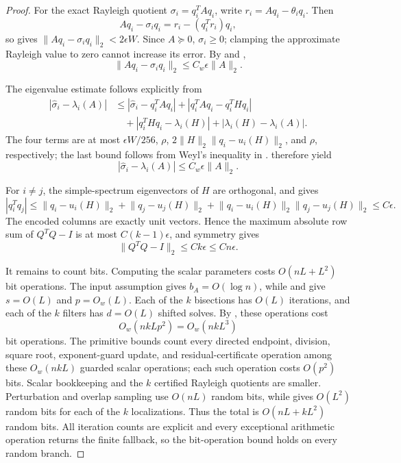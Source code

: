 \documentclass[11pt]{article}
\begin{document}
\begin{proof}
For the exact Rayleigh quotient $\sigma_i=q_i^TAq_i$, write
$r_i=Aq_i-\theta_iq_i$.  Then
\[
 Aq_i-\sigma_iq_i=r_i-(q_i^Tr_i)q_i,
\]
so  gives
$\lVert Aq_i-\sigma_iq_i\rVert_2<2\epsilon W$.  Since $A\succeq0$,
$\sigma_i\geq0$; clamping the approximate Rayleigh value to zero cannot
increase its error.  By  and
,
\begin{equation}
 \label{eq:final-residual}
 \lVert Aq_i-\widehat\sigma_iq_i\rVert_2
 \leq C_w\epsilon\lVert A\rVert_2.
\end{equation}

The eigenvalue estimate follows explicitly from
\begin{align*}
 |\widehat\sigma_i-\lambda_i(A)|
 &\leq |\widehat\sigma_i-q_i^TAq_i|
   +|q_i^TAq_i-q_i^THq_i|\\
 &\quad+|q_i^THq_i-\lambda_i(H)|
   +|\lambda_i(H)-\lambda_i(A)|.
\end{align*}
The four terms are at most $\epsilon W/256$, $\rho$,
$2\lVert H\rVert_2\lVert q_i-u_i(H)\rVert_2$, and $\rho$, respectively;
the last bound follows from Weyl's inequality in .
 therefore yield
\begin{equation}
 \label{eq:final-eigenvalue}
 |\widehat\sigma_i-\lambda_i(A)|
 \leq C_w\epsilon\lVert A\rVert_2.
\end{equation}

For $i\ne j$, the simple-spectrum eigenvectors of $H$ are orthogonal, and
 gives
\[
 |q_i^Tq_j|
 \leq\lVert q_i-u_i(H)\rVert_2+
 \lVert q_j-u_j(H)\rVert_2+
 \lVert q_i-u_i(H)\rVert_2\lVert q_j-u_j(H)\rVert_2
 \leq C\epsilon.
\]
The encoded columns are exactly unit vectors.  Hence the maximum absolute
row sum of $Q^TQ-I$ is at most $C(k-1)\epsilon$, and symmetry gives
\begin{equation}
 \label{eq:gram-bound}
 \lVert Q^TQ-I\rVert_2\leq Ck\epsilon\leq Cn\epsilon.
\end{equation}

It remains to count bits.  Computing the scalar parameters costs
$O(nL+L^2)$ bit operations.  The input assumption gives
$b_A=O(\log n)$, while  and
 give $s=O(L)$ and $p=O_w(L)$.  Each of the $k$
bisections has $O(L)$ iterations, and each of the $k$ filters has $d=O(L)$
shifted solves.  By
, these operations cost
\[
 O_w(nkLp^2)=O_w(nkL^3)
\]
bit operations.  The primitive bounds count every directed endpoint,
division, square root, exponent-guard update, and residual-certificate
operation among these $O_w(nkL)$ guarded scalar operations; each such
operation costs $O(p^2)$ bits.  Scalar bookkeeping and the $k$ certified
Rayleigh quotients are smaller.
Perturbation and overlap sampling use $O(nL)$ random
bits, while  gives $O(L^2)$ random bits for each
of the $k$ localizations.  Thus the total is $O(nL+kL^2)$ random bits.  All
iteration counts are explicit and every exceptional arithmetic operation
returns the finite fallback, so the bit-operation bound holds on every random
branch.


\end{proof}
\end{document}
